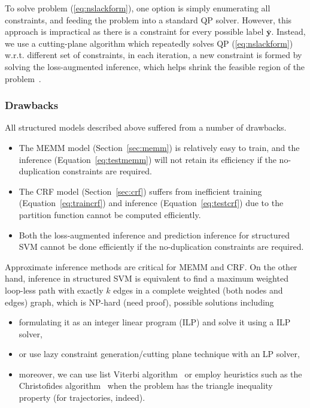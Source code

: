 \documentclass[9pt]{extarticle}
\begin{document}
To solve problem (\ref{eq:nslackform}), one option is simply enumerating all constraints, and feeding the problem into a standard QP solver.
However, this approach is impractical as there is a constraint for every possible label $\bar{\mathbf{y}}$.
Instead, we use a cutting-plane algorithm which repeatedly solves QP (\ref{eq:nslackform}) w.r.t. different set of constraints, 
in each iteration, a new constraint is formed by solving the loss-augmented inference, 
which helps shrink the feasible region of the problem~\cite{joachims2009predicting}.



\subsubsection{Drawbacks}

All structured models described above suffered from a number of drawbacks.
\begin{itemize}
\item The MEMM model (Section~\ref{sec:memm}) is relatively easy to train, 
      and the inference (Equation~\ref{eq:testmemm}) will not retain its efficiency if the no-duplication constraints are required.
\item The CRF model (Section~\ref{sec:crf}) suffers from inefficient training (Equation~\ref{eq:traincrf}) and 
      inference (Equation~\ref{eq:testcrf}) due to the partition function cannot be computed efficiently.
\item Both the loss-augmented inference and prediction inference for structured SVM cannot be done efficiently 
      if the no-duplication constraints are required.
\end{itemize}

Approximate inference methods are critical for MEMM and CRF.
On the other hand, inference in structured SVM is equivalent to 
find a maximum weighted loop-less path with exactly $k$ edges in a complete weighted (both nodes and edges) graph, which is NP-hard (need proof),
possible solutions including 
\begin{itemize}
\item formulating it as an integer linear program (ILP) and solve it using a ILP solver,
\item or use lazy constraint generation/cutting plane technique with an LP solver,
\item moreover, we can use list Viterbi algorithm~\cite{nill1995list} or employ heuristics such as the Christofides algorithm~\cite{christofides1976} 
      when the problem has the triangle inequality property (for trajectories, indeed).
\end{itemize}
\end{document}
